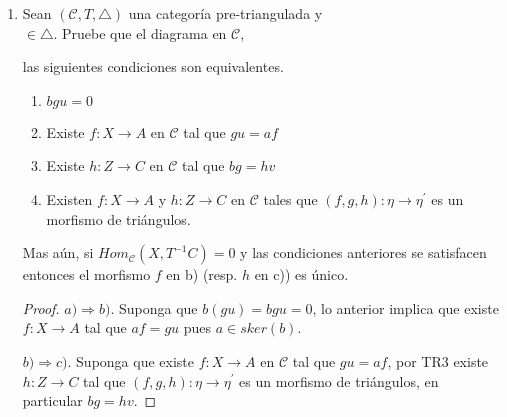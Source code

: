 \documentclass{article}
\newcommand{\cc}{\mathscr{C}}
\begin{document}
\begin{enumerate}
\begin{proof}
Ahora, por el lema de Yoneda existe $g:B\to A$ tal que \\$\operatorname{Hom}^{-1}_{\mathscr{C}}(A,h)= 
\operatorname{Hom}_{\mathscr{C}}(A,g)$ en particular \\
$h\circ g=\operatorname{Hom}^{-1}_{\mathscr{C}}(A,h)(g)=
\operatorname{Hom}_{\mathscr{C}}(A,h)\operatorname{Hom}^{-1}_{\mathscr{C}}(A,h)(1_B) =1_B$ y \\
$g\circ h=\operatorname{Hom}^{-1}_{\mathscr{C}}(A,h)\operatorname{Hom}_{\mathscr{C}}(A,h)(1_A)=1_A$ 
por lo que $h$ es isomorfismo.

\end{proof}

\item Sean $(\mathscr{C},T,\triangle)$ una categoría pre-triangulada y  \\  $\in \triangle$. Pruebe que el diagrama en $\mathscr{C}$,

\begin{center}
\end{center}
las siguientes condiciones son equivalentes.

\begin{enumerate}
\item $bgu=0$
\item Existe $f:X\to A$ en $\mathscr{C}$ tal que $gu=af$
\item Existe $h:Z\to C$ en $\mathscr{C}$ tal que $bg=hv$
\item Existen $f:X\to A$ y $h:Z\to C$ en $\mathscr{C}$ tales que $(f,g,h):\eta \to \eta^{'}$ es un morfismo de triángulos. 
\end{enumerate}
Mas a\'un, si $Hom_{\mathscr{C}}(X,T^{-1}C)=0$ y las condiciones anteriores se satisfacen entonces el morfismo $f$ en b) (resp. $h$ en c)) es \'unico.

\begin{proof}
$a) \Rightarrow b)$. Suponga que $b(gu)=bgu=0$, lo anterior implica que existe $f:X\to A$ tal que $af=gu$ pues $a\in sker(b)$.

\bigskip

$b) \Rightarrow c)$. Suponga que existe $f:X\to A$ en $\cc$ tal que $gu=af$, por TR3 existe $h:Z\to C$ tal que $(f,g,h):\eta \to \eta^{'}$ es un morfismo de triángulos, en particular $bg=hv$.


\end{proof}
\end{enumerate}
\end{document}
